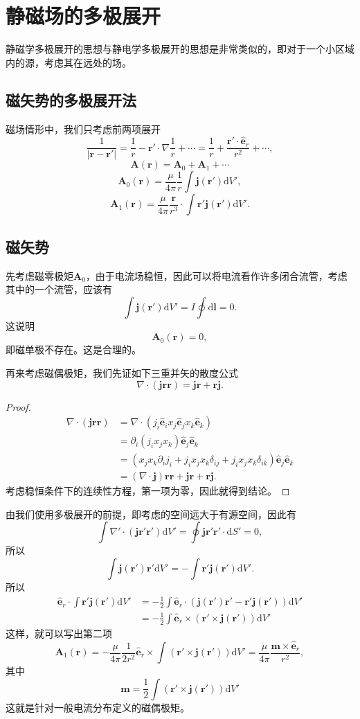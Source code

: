 \documentclass[UTF8]{ctexbook}
\renewcommand{\d}{\mathrm{d}}
\renewcommand{\b}{\boldsymbol}
\newtheorem{proof}{证明}
\numberwithin{equation}{chapter}
\begin{document}
	\section{静磁场的多极展开}
	静磁学多极展开的思想与静电学多极展开的思想是非常类似的，即对于一个小区域内的源，考虑其在远处的场。
	\subsection{磁矢势的多极展开法}
	磁场情形中，我们只考虑前两项展开
	\[\frac{1}{|\b{r}-\b{r}'|}=\frac{1}{r}-\b{r}'\cdot\nabla\frac{1}{r}+\cdots=\frac{1}{r}+\frac{\b{r}'\cdot\hat{\b{e}}_r}{r^2}+\cdots,\]
	\[\b{A}(\b{r})=\b{A}_0+\b{A}_1+\cdots\]
	\[\b{A}_0(\b{r})=\frac{\mu}{4\pi}\frac{1}{r}\int \b{j}(\b{r}')\d V',\]
	\[\b{A}_1(\b{r})=\frac{\mu}{4\pi}\frac{\b{r}}{r^3}\cdot\int \b{r}'\b{j}(\b{r}')\d V'.\]
	
	\subsection{磁矢势}
	先考虑磁零极矩$\b{A}_0$，由于电流场稳恒，因此可以将电流看作许多闭合流管，考虑其中的一个流管，应该有
	\[\int \b{j}(\b{r}')\d V'=I\oint\d \b{l}=0.\]
	这说明
	\[\b{A}_0(\b{r})=0,\]
	即磁单极不存在。这是合理的。
	
	再来考虑磁偶极矩，我们先证如下三重并矢的散度公式
	\[\nabla\cdot(\b{j}\b{r}\b{r})=\b{j}\b{r}+\b{r}\b{j}.\]
	\begin{proof}
		\begin{align*}
			\nabla\cdot(\b{j}\b{r}\b{r}) &= \nabla\cdot(j_i\hat{\b{e}}_ix_j\hat{\b{e}}_jx_k\hat{\b{e}}_k) \\
			&=\partial_i(j_ix_jx_k)\hat{\b{e}}_j\hat{\b{e}}_k \\
			&=(x_jx_k\partial_i j_i+j_ix_jx_k\delta_{ij}+j_ix_jx_k\delta_{ik})\hat{\b{e}}_j\hat{\b{e}}_k\\
			&=(\nabla\cdot\b{j})\b{r}\b{r}+\b{j}\b{r}+\b{r}\b{j}.
		\end{align*}
		考虑稳恒条件下的连续性方程，第一项为零，因此就得到结论。
	\end{proof}
	由我们使用多极展开的前提，即考虑的空间远大于有源空间，因此有
	\[\int \nabla'\cdot(\b{j}\b{r}'\b{r}')\d V'=\oint \b{j}\b{r}'\b{r}'\cdot\d S'=0,\]
	所以
	\[\int\b{j}(\b{r}')\b{r}'\d V'=-\int\b{r}'\b{j}(\b{r}')\d V'.\]
	所以
	\begin{align*}
		\hat{\b{e}}_r\cdot\int\b{r}'\b{j}(\b{r}')\d V'&=-\frac{1}{2}\int \hat{\b{e}}_r\cdot(\b{j}(\b{r}')\b{r}'-\b{r}'\b{j}(\b{r}'))\d V' \\
		&=-\frac{1}{2}\int \hat{\b{e}}_r\times(\b{r}'\times\b{j}(\b{r}'))\d V'
	\end{align*}
	这样，就可以写出第二项
	\[\b{A}_1(\b{r})=-\frac{\mu}{4\pi}\frac{1}{2r^2}\hat{\b{e}}_r\times\int (\b{r}'\times\b{j}(\b{r}'))\d V' = \frac{\mu}{4\pi}\frac{\b{m}\times\hat{\b{e}}_r}{r^2},\]
	其中
	\[\b{m}=\frac{1}{2}\int (\b{r}'\times\b{j}(\b{r}'))\d V'\]
	这就是针对一般电流分布定义的磁偶极矩。
	
\end{document}

